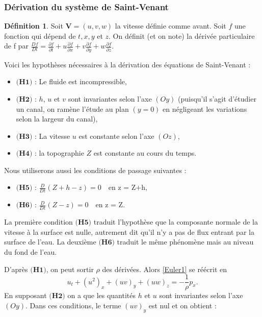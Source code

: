 \documentclass[
11pt, %
francais, %
singlespacing, %
headsepline, %
f%
]{MastersDoctoralThesis} %
\theoremstyle{definition}
\newtheorem{definition}{Définition}
\begin{document}
\subsubsection{Dérivation du système de Saint-Venant}

\begin{definition}
Soit $\textbf{V}=(u,v,w)$ la vitesse définie comme avant. Soit $f$ une fonction qui dépend de $t,x,y$ et $z$.
On définit (et on note) la dérivée particulaire de f par 
$\frac{Df}{Dt} = \frac{\partial f}{\partial t}+u\frac{\partial f}{\partial x}+v\frac{\partial f}{\partial y}+w\frac{\partial f}{\partial z}.$
\end{definition}


Voici les hypothèses nécessaires à la dérivation des équations de Saint-Venant :

\begin{itemize}
\item $\textbf{(H1)}$ : Le fluide est incompressible,
\item $\textbf{(H2)}$ : $h$, $u$ et $v$ sont invariantes selon l'axe $(Oy)$ (puisqu'il s'agit d'étudier un canal, on ramène l'étude au plan $(y=0)$ en négligeant les variations selon la largeur du canal),
\item $\textbf{(H3)}$  : La vitesse $u$ est constante selon l'axe $(Oz)$,
\item $\textbf{(H4)}$ : la topographie $Z$ est constante au cours du temps.
\end{itemize}

Nous utiliserons aussi les conditions de passage suivantes :

\begin{itemize}
\item $\textbf{(H5)}$ : $\frac{D}{Dt} (Z+h-z) = 0 \quad \text{en z = Z+h}$,
\item $\textbf{(H6)}$ : $\frac{D}{Dt} (Z-z) = 0 \quad \text{en z = Z}$.
\end{itemize}

La première condition $\textbf{(H5)}$ traduit l'hypothèse que la composante normale de la vitesse à la surface est nulle, autrement dit qu'il n'y a pas de flux entrant par la surface de l'eau. La deuxième $\textbf{(H6)}$ traduit le même phénomène mais au niveau du fond de l'eau.

D'après $\textbf{(H1)}$, on peut sortir $\rho$ des dérivées. Alors \eqref{Euler1} se réécrit en 
\begin{equation} u_{t} + (u^{2})_{x}+(uv)_{y}+(uw)_{z} =-\frac{1}{\rho}p_{x}. \label{dvpt2}\end{equation}
En supposant  $\textbf{(H2)}$ on a que les quantités $h$ et $u$ sont invariantes selon l'axe $(Oy)$. Dans ces conditions, le terme $(uv)_{y}$ est nul et on obtient :
\end{document}
